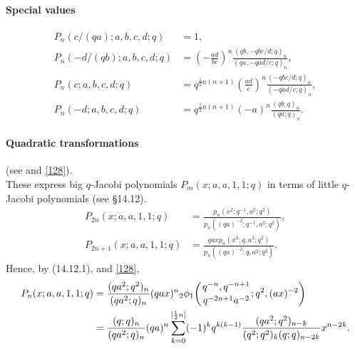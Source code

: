 \documentclass[twoside,11pt]{article}
\newcommand\half{\frac12}
\newcommand{\qhypK}[5]{ \mbox{}_{#1}\phi_{#2}\!\left(
  \genfrac{}{}{0pt}{}{#3}{#4};#5\right)}
\begin{document}
\paragraph{Special values}
\begin{align}
P_n(c/(qa);a,b,c,d;q)&=1,\\
P_n(-d/(qb);a,b,c,d;q)&=\left(- \frac{ad}{bc}\right)^n 
\frac{(qb,-qbc/d;q)_n}{(qa,-qad/c;q)_n} ,\\
P_n(c;a,b,c,d;q)&=
q^{\half n(n+1)}\left(\frac{ad}c\right)^n
\frac{(-qbc/d;q)_n}{(-qad/c;q)_n} ,\\
P_n(-d;a,b,c,d;q)&=q^{\half n(n+1)} (-a)^n \frac{(qb;q)_n}{(qa;q)_n} .
\end{align}
%
\paragraph{Quadratic transformations}
(see \cite[(2.48), (2.49)]{K17} and \eqref{128}).\\
These express big $q$-Jacobi polynomials $P_m(x;a,a,1,1;q)$ in terms of little
$q$-Jacobi polynomials (see \S14.12).
\begin{align}
P_{2n}(x;a,a,1,1;q)&=\frac{p_n(x^2;q^{-1},a^2;q^2)}{p_n((qa)^{-2};q^{-1},a^2;q^2)} ,
\label{130}\\
P_{2n+1}(x;a,a,1,1;q)&=\frac{qax p_n(x^2;q,a^2;q^2)}{p_n((qa)^{-2};q,a^2;q^2)} .
\label{131}
\end{align}
Hence, by (14.12.1),  and \eqref{128},
\begin{align}
P_n(x;a,a,1,1;q)&=\frac{(qa^2;q^2)_n}{(qa^2;q)_n} (qax)^n 
\qhypK21{q^{-n},q^{-n+1}}{q^{-2n+1}a^{-2}}{q^2,(ax)^{-2}}
\label{136}\\
&=\frac{(q;q)_n}{(qa^2;q)_n} (qa)^n 
\sum_{k=0}^{[\half n]}(-1)^k q^{k(k-1)}
\frac{(qa^2;q^2)_{n-k}}{(q^2;q^2)_k (q;q)_{n-2k}} x^{n-2k}.
\label{137}
\end{align}
%
\end{document}
